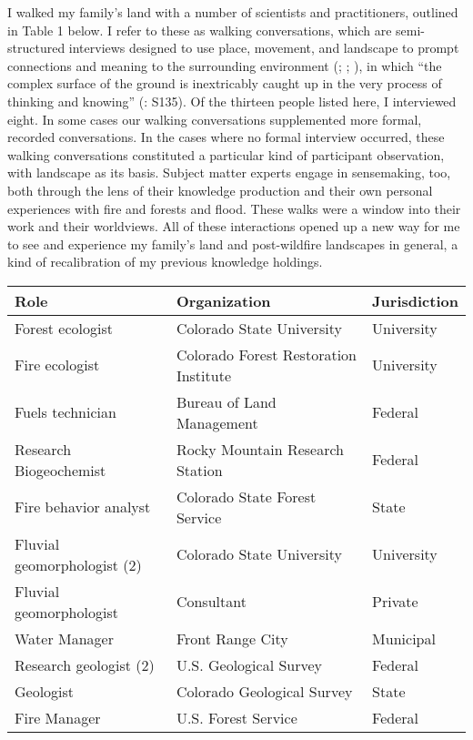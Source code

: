 \documentclass[
]{article}
\begin{document}
I walked my family's land with a number of scientists and practitioners, outlined in Table 1 below. I refer to these as walking conversations, which are semi-structured interviews designed to use place, movement, and landscape to prompt connections and meaning to the surrounding environment (; ; ), in which ``the complex surface of the ground is inextricably caught up in the very process of thinking and knowing'' (: S135). Of the thirteen people listed here, I interviewed eight. In some cases our walking conversations supplemented more formal, recorded conversations. In the cases where no formal interview occurred, these walking conversations constituted a particular kind of participant observation, with landscape as its basis. Subject matter experts engage in sensemaking, too, both through the lens of their knowledge production and their own personal experiences with fire and forests and flood. These walks were a window into their work and their worldviews. All of these interactions opened up a new way for me to see and experience my family's land and post-wildfire landscapes in general, a kind of recalibration of my previous knowledge holdings.

\begin{longtable}[]{@{}lll@{}}
\toprule\noalign{}
\textbf{Role} & \textbf{Organization} & \textbf{Jurisdiction} \\
\midrule\noalign{}
\endhead
\bottomrule\noalign{}
\endlastfoot
Forest ecologist & Colorado State University & University \\
Fire ecologist & Colorado Forest Restoration Institute & University \\
Fuels technician & Bureau of Land Management & Federal \\
Research Biogeochemist & Rocky Mountain Research Station & Federal \\
Fire behavior analyst & Colorado State Forest Service & State \\
Fluvial geomorphologist (2) & Colorado State University & University \\
Fluvial geomorphologist & Consultant & Private \\
Water Manager & Front Range City & Municipal \\
Research geologist (2) & U.S. Geological Survey & Federal \\
Geologist & Colorado Geological Survey & State \\
Fire Manager & U.S. Forest Service & Federal \\
\end{longtable}
\end{document}
